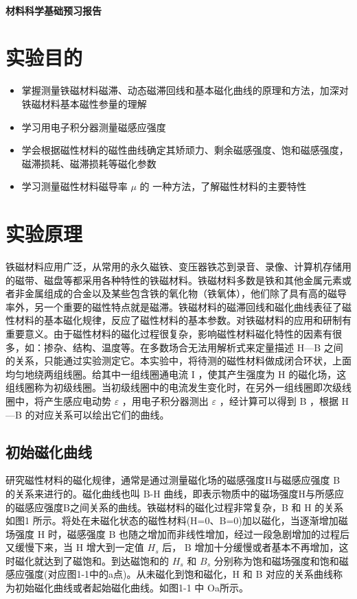 \documentclass[a4paper,utf8]{article}
\begin{document}
\begin{center}
    {\mbox{}\\[7em]\bfseries\songti%
    材料科学基础预习报告}\\[34mm]
\end{center}
\newpage
\section{实验目的}
    \begin{itemize}
        \item 掌握测量铁磁材料磁滞、动态磁滞回线和基本磁化曲线的原理和方法，加深对铁磁材料基本磁性参量的理解 
        \item 学习用电子积分器测量磁感应强度
        \item 学会根据磁性材料的磁性曲线确定其矫顽力、剩余磁感强度、饱和磁感强度，磁滞损耗、磁滞损耗等磁化参数
        \item 学习测量磁性材料磁导率 $\mu$ 的 一种方法，了解磁性材料的主要特性
    \end{itemize}
\section{实验原理}%
    铁磁材料应用广泛，从常用的永久磁铁、变压器铁芯到录音、录像、计算机存储用的磁带、磁盘等都采用各种特性的铁磁材料。铁磁材料多数是铁和其他金属元素或者非金属组成的合金以及某些包含铁的氧化物（铁氧体），他们除了具有高的磁导率外，另一个重要的磁性特点就是磁滞。铁磁材料的磁滞回线和磁化曲线表征了磁性材料的基本磁化规律，反应了磁性材料的基本参数。对铁磁材料的应用和研制有重要意义。由于磁性材料的磁化过程很复杂，影响磁性材料磁化特性的因素有很多，如：掺杂、结构、温度等。在多数场合无法用解析式来定量描述 H—B 之间的关系，只能通过实验测定它。本实验中，将待测的磁性材料做成闭合环状，上面均匀地绕两组线圈。给其中一组线圈通电流 I ，使其产生强度为 H 的磁化场，这组线圈称为初级线圈。当初级线圈中的电流发生变化时，在另外一组线圈即次级线圈中，将产生感应电动势 $\varepsilon$ ，用电子积分器测出 $\varepsilon$ ，经计算可以得到 B ，根据 H—B 的对应关系可以绘出它们的曲线。
    \subsection{初始磁化曲线}
        研究磁性材料的磁化规律，通常是通过测量磁化场的磁感强度H与磁感应强度 B 的关系来进行的。磁化曲线也叫 B-H 曲线，即表示物质中的磁场强度H与所感应的磁感应强度B之间关系的曲线。铁磁材料的磁化过程非常复杂，B 和 H 的关系如图1 所示。将处在未磁化状态的磁性材料(H=0、B=0)加以磁化，当逐渐增加磁场强度 H 时，磁感强度 B 也随之增加而非线性增加，经过一段急剧增加的过程后又缓慢下来，当 H 增大到一定值 $H_s$ 后， B 增加十分缓慢或者基本不再增加，这时磁化就达到了磁饱和。到达磁饱和的 $H_s$ 和 $B_s$ 分别称为饱和磁场强度和饱和磁感应强度(对应图1-1中的a点)。从未磁化到饱和磁化，H 和 B 对应的关系曲线称为初始磁化曲线或者起始磁化曲线。如图1-1 中 Oa所示。
        \begin{figure}
            
        \end{figure}
\end{document}
